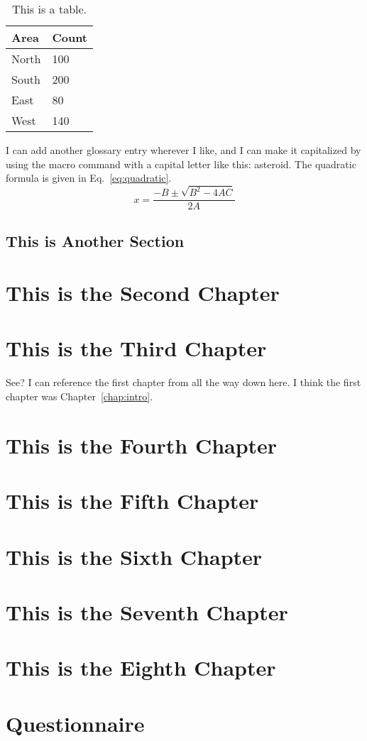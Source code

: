 \documentclass[12pt]{cwru_thesis}
\begin{document}
\begin{table}[hbt!]
\centering
\begin{tabular}{ll}
\hline
Area & Count\\
\hline
North & 100\\
South & 200\\
East & 80\\
West & 140\\
\hline
\end{tabular}
\caption{This is a table. \label{tab:sample}}
\end{table}

\lipsum[3] 

I can add another glossary entry wherever I like, and I can make it capitalized by using the macro command with a capital letter like this: \Gls{asteroid}. The quadratic formula is given in Eq.~\eqref{eq:quadratic}.
\begin{equation}
    x=\frac{-B \pm \sqrt{B^2 - 4AC}}{2A}
    \label{eq:quadratic}
\end{equation}

\lipsum[4-5] 

\section{This is Another Section}
\lipsum[6-7] 

\chapter{This is the Second Chapter}
\lipsum[8-9]


\chapter{This is the Third Chapter}
See? I can reference the first chapter from all the way down here. I think the first chapter was Chapter~\ref{chap:intro}.
\chapter{This is the Fourth Chapter}
\chapter{This is the Fifth Chapter}
\chapter{This is the Sixth Chapter}
\chapter{This is the Seventh Chapter}
\chapter{This is the Eighth Chapter}


\appendix

\chapter{Questionnaire}

\printbibliography[heading=bibintoc]
\end{document}
